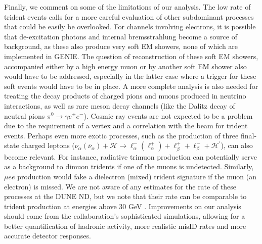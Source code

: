 Finally, we comment on some of the limitations of our analysis. The low rate of trident events calls for a more careful evaluation of other subdominant processes that could be easily be overlooked. For channels involving electrons, it is possible that de-excitation photons and internal bremsstrahlung become a source of background, as these also produce very soft EM showers, none of which are implemented in GENIE. The question of reconstruction of these soft EM showers, accompanied either by a high energy muon or by another soft EM shower also would have to be addressed, especially in the latter case where a trigger for these soft events would have to be in place. A more complete analysis is also needed for treating the decay products of charged pions and muons produced in neutrino interactions, as well as rare meson decay channels (like the Dalitz decay of neutral pions $\pi^0 \to \gamma e^+ e^-$). Cosmic ray events are not expected to be a problem due to the requirement of a vertex and a correlation with the beam for trident events. Perhaps even more exotic processes, such as the production of three final-state charged leptons ($\nu_{\alpha} (\overline{\nu}_{\alpha}) + \mathcal{H} \to  \ell_\alpha^- (\ell_\alpha^+) + \ell_\beta^+ + \ell_{\beta}^- + \mathcal{H^\prime}$), can also become relevant. For instance, radiative trimuon production \cite{Smith:1977nx} can potentially serve as a background to dimuon tridents if one of the muons is undetected. Similarly, $\mu e e$ production would fake a dielectron (mixed) trident signature if the muon (an electron) is missed. We are not aware of any estimates for the rate of these processes at the DUNE ND, but we note that their rate can be comparable to trident production at energies above $30$ GeV \cite{Albright:1978mg}. Improvements on our analysis should come from the collaboration's sophisticated simulations, allowing for a better quantification of hadronic activity, more realistic misID rates and more accurate detector responses.  

